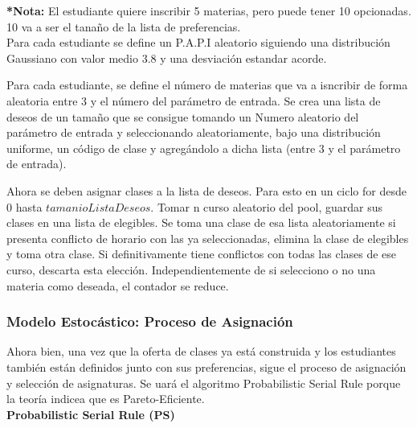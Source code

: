\documentclass{article}
\begin{document}
\textbf{*Nota:} El estudiante quiere inscribir 5 materias, pero puede tener 10 opcionadas.
10 va a ser el tanaño de la lista de preferencias.\\

Para cada estudiante se define un P.A.P.I aleatorio siguiendo una distribución
Gaussiano con valor medio 3.8 y una desviación estandar acorde.

Para cada estudiante, se define el número de materias que va a isncribir de forma aleatoria
entre 3 y el número del parámetro de entrada. Se crea una lista de deseos de un tamaño 
que se consigue tomando un Numero
aleatorio del parámetro de entrada y seleccionando aleatoriamente, bajo una distribución 
uniforme, un código de clase y agregándolo a dicha lista (entre 3 y el parámetro de entrada).

Ahora se deben asignar clases a la lista de deseos. Para esto en un ciclo for
desde 0 hasta $tamanioListaDeseos$. Tomar n curso aleatorio del pool, guardar sus clases en una 
lista de elegibles. Se toma una clase de esa lista aleatoriamente si presenta conflicto de horario 
con las ya seleccionadas, elimina la clase de elegibles y toma otra clase. Si definitivamente tiene 
conflictos con todas las clases de ese curso, descarta
esta elección. Independientemente de si selecciono o no una materia como deseada, el contador 
se reduce.

\subsubsection{Modelo Estocástico: Proceso de Asignación}

Ahora bien, una vez que la oferta de clases ya está construida y los estudiantes también están 
definidos junto con sus preferencias, sigue el proceso de asignación y selección de asignaturas. 
Se uará el algoritmo Probabilistic Serial Rule porque la teoría indicea que es Pareto-Eficiente.\\


\textbf{Probabilistic Serial Rule (PS)}
\end{document}
